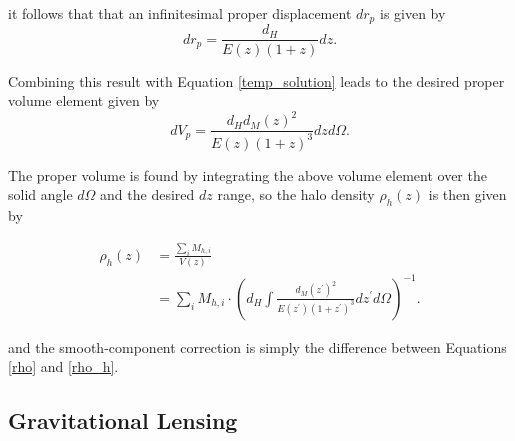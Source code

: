 \documentclass[%
 reprint,
 amsmath,amssymb,
 aps,nofootinbib
]{revtex4-1}
\begin{document}
\noindent it follows that that an infinitesimal proper displacement $dr_p$ is given by
\begin{equation}\label{physical2comoving_inf}
dr_p=\frac{d_H}{E(z)(1+z)}dz.
\end{equation}

\noindent Combining this result with Equation \eqref{temp_solution} leads to the desired proper volume element given by
\begin{equation}
dV_p=\frac{d_Hd_M(z)^2}{E(z)(1+z)^3}dzd\Omega.
\end{equation}

The proper volume is found by integrating the above volume element over the solid angle $d\Omega$ and the desired $dz$ range, so the halo density $\rho_h(z)$ is then given by

\begin{align}\label{rho_h}
\rho_h(z)&=\frac{\sum_i M_{h,i}}{V(z)}\nonumber\\
&=\sum_i M_{h,i}\cdot\left(d_H\int\frac{d_M(z^\prime)^2}{E(z^\prime)(1+z^\prime)^3}dz^\prime d\Omega\right)^{-1}.
\end{align}

\noindent and the smooth-component correction is simply the difference between Equations \eqref{rho} and \eqref{rho_h}.


\subsection{Gravitational Lensing}
\end{document}
